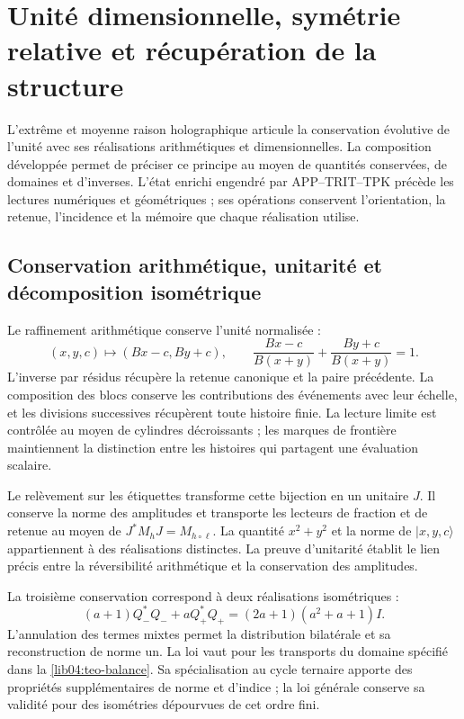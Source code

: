 \section{Unité dimensionnelle, symétrie relative et récupération de la structure}
\label{lib06:sintesis}

L’extrême et moyenne raison holographique articule la conservation évolutive
de l’unité avec ses réalisations arithmétiques et dimensionnelles. La
composition développée permet de préciser ce principe au moyen de
quantités conservées, de domaines et d’inverses. L’état enrichi
engendré par APP--TRIT--TPK précède les lectures numériques et
géométriques ; ses opérations conservent l’orientation, la retenue,
l’incidence et la mémoire que chaque réalisation utilise.

\subsection{Conservation arithmétique, unitarité et décomposition isométrique}
\label{lib06:tres-conservaciones}

Le raffinement arithmétique conserve l'unité normalisée :
\begin{equation}
 (x,y,c)\longmapsto(Bx-c,By+c),\qquad
 \frac{Bx-c}{B(x+y)}+\frac{By+c}{B(x+y)}=1.
 \label{lib06:unidad}
\end{equation}
L'inverse par résidus récupère la retenue canonique et la paire précédente. La composition des blocs conserve les contributions des événements avec leur échelle, et les divisions successives récupèrent toute histoire finie. La lecture limite est contrôlée au moyen de cylindres décroissants ; les marques de frontière maintiennent la distinction entre les histoires qui partagent une évaluation scalaire.

Le relèvement sur les étiquettes transforme cette bijection en un
unitaire \(J\). Il conserve la norme des amplitudes et transporte
les lecteurs de fraction et de retenue au moyen de
\(J^*M_hJ=M_{h\circ\ell}\). La quantité \(x^2+y^2\) et la norme
de \(|x,y,c\rangle\) appartiennent à des réalisations distinctes. La
preuve d’unitarité établit le lien précis entre la
réversibilité arithmétique et la conservation des amplitudes.

La troisième conservation correspond à deux réalisations isométriques :
\begin{equation}
 (a+1)Q_-^*Q_-+aQ_+^*Q_+
 =(2a+1)(a^2+a+1)I.
 \label{lib06:balance}
\end{equation}
L’annulation des termes mixtes permet la distribution
bilatérale et sa reconstruction de norme un. La loi vaut pour les
transports du domaine spécifié dans la
\cref{lib04:teo-balance}. Sa spécialisation au cycle ternaire
apporte des propriétés supplémentaires de norme et d’indice ; la loi générale
conserve sa validité pour des isométries dépourvues de cet ordre fini.

